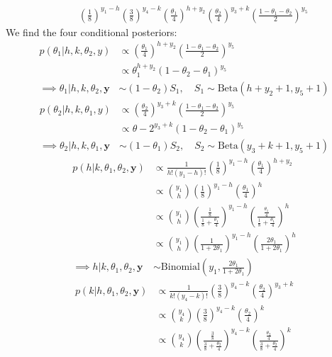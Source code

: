 \documentclass[a4paper,12pt]{article}\usepackage[]{graphicx}\usepackage[]{color}
\newcommand{\by}{\mathbf{y}}
\newcommand{\Beta}{\mathrm{Beta}}
\newcommand{\Binomial}{\mathrm{Binomial}}
\begin{document}
\begin{enumerate}[label=(\alph*)]
\begin{align*}
&\quad \left(\frac{1}{8}\right)^{y_1-h}\left(\frac{3}{8}\right)^{y_4-k}\left(\frac{\theta_1}{4}\right)^{h+y_2}\left(\frac{\theta_2}{4}\right)^{y_3+k}\left(\frac{1-\theta_1-\theta_2}{2}\right)^{y_5}
\end{align*}
We find the four conditional posteriors:
\begin{align*}
p(\theta_1|h,k,\theta_2,y)&\propto \left(\frac{\theta_1}{4}\right)^{h+y_2}\left(\frac{1-\theta_1-\theta_2}{2}\right)^{y_5}\\
&\propto \theta_1^{h+y_2}(1-\theta_2-\theta_1)^{y_5} \\
\implies \theta_1|h,k,\theta_2,\by&\sim (1-\theta_2)S_1,\quad S_1\sim\Beta(h+y_2+1,y_5+1)
\end{align*}
\begin{align*}
p(\theta_2|h,k,\theta_1,y)&\propto \left(\frac{\theta_2}{4}\right)^{y_3+k}\left(\frac{1-\theta_1-\theta_2}{2}\right)^{y_5}\\
&\propto \theta-2^{y_3+k}(1-\theta_2-\theta_1)^{y_5}\\
\implies \theta_2|h,k,\theta_1,\by&\sim (1-\theta_1)S_2,\quad S_2\sim\Beta(y_3+k+1,y_5+1)
\end{align*}
\begin{align*}
p(h|k,\theta_1,\theta_2,\by)&\propto \frac{1}{h!(y_1-h)!}\left(\frac{1}{8}\right)^{y_1-h}\left(\frac{\theta_1}{4}\right)^{h+y_2}\\
&\propto \binom{y_1}{h}\left(\frac{1}{8}\right)^{y_1-h}\left(\frac{\theta_1}{4}\right)^{h}\\
&\propto \binom{y_1}{h}\left(\frac{\frac{1}{8}}{\frac{1}{8}+\frac{\theta_1}{4}}\right)^{y_1-h}\left(\frac{\frac{\theta_1}{4}}{\frac{1}{8}+\frac{\theta_1}{4}}\right)^{h}\\
&\propto \binom{y_1}{h}\left(\frac{1}{1+2\theta_1}\right)^{y_1-h}\left(\frac{2\theta_1}{1+2\theta_1}\right)^{h}\\
\implies h|k,\theta_1,\theta_2,\by&\sim \Binomial\left(y_1,\frac{2\theta_1}{1+2\theta_1}\right)
\end{align*}
\begin{align*}
p(k|h,\theta_1,\theta_2,\by)&\propto \frac{1}{k!(y_4-k)!}\left(\frac{3}{8}\right)^{y_4-k}\left(\frac{\theta_2}{4}\right)^{y_3+k}\\
&\propto \binom{y_4}{k}\left(\frac{3}{8}\right)^{y_4-k}\left(\frac{\theta_2}{4}\right)^{k}\\
&\propto \binom{y_4}{k}\left(\frac{\frac{3}{8}}{\frac{3}{8}+\frac{\theta_2}{4}}\right)^{y_4-k}\left(\frac{\frac{\theta_2}{4}}{\frac{3}{8}+\frac{\theta_2}{4}}\right)^{k}\\

\end{align*}
\end{enumerate}
\end{document}
